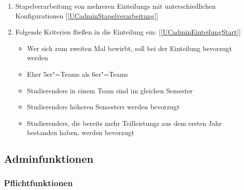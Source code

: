 \documentclass[parskip=full]{scrartcl}
\newcommand{\swtLabel}[1]{\textbf{/#1\arabic*0/}}
\newcommand{\testRef}[1]{[\ref{#1}]}
\begin{document}
 \begin{enumerate}[label=\swtLabel{FA}, resume]
 \item Stapelverarbeitung von mehreren \glspl{Einteilung} mit unterschiedlichen
 Konfigurationen \label{FAeinteilungStapel} \testRef{UCadminStapelverarbeitung}
 \item Folgende Kriterien fließen in die \gls{Einteilung} ein:
 \testRef{UCadminEinteilungStart}
 \begin{itemize}
 	\item Wer sich zum zweiten Mal bewirbt, soll bei der \gls{Einteilung} bevorzugt
 	werden
 	\item Eher 5er"=\glspl{Team} als 6er"=\glspl{Team}
 	\item \glspl{Studierender} in einem \gls{Team} sind im gleichen Semester
 	\item \glspl{Studierender} höheren Semesters werden bevorzugt
 	\item \glspl{Studierender}, die bereits mehr \glspl{Teilleistung} aus dem ersten Jahr
 	bestanden haben, werden bevorzugt
 \end{itemize} \label{FAeinteilungWunschKriterien}
 
\end{enumerate}


\subsection{\gls{Admin}funktionen}

\subsubsection{Pflichtfunktionen}
\end{document}
